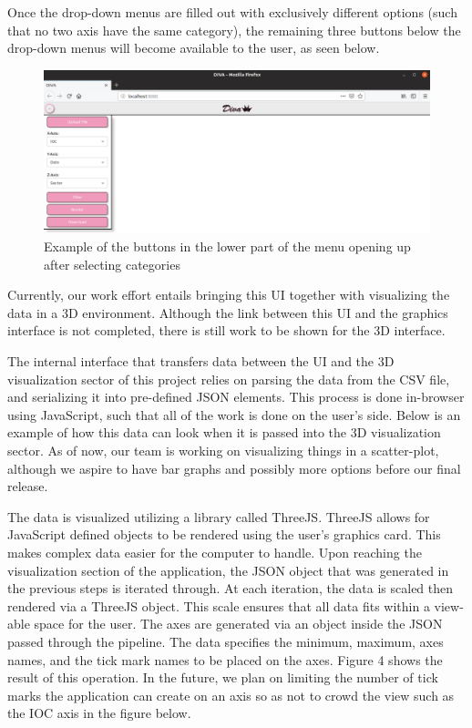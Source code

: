 \documentclass[journal,10pt,onecolumn,compsoc]{IEEEtran} \usepackage[margin=1.0in]{geometry} \usepackage{pdfpages}
\begin{document}
 Once the drop-down menus are filled out with exclusively different options (such that no two axis have the same category), the remaining three buttons below the drop-down menus will become available to the user, as seen below. 

     \begin{figure}[H]
        \centering
        \includegraphics[width=\linewidth]{menu3.png}
        \caption{Example of the buttons in the lower part of the menu opening up after selecting categories}
    \end{figure}

Currently, our work effort entails bringing this UI together with visualizing the data in a 3D environment. Although the link between this UI and the graphics interface is not completed, there is still work to be shown for the 3D interface. \newline
\newpage

The internal interface that transfers data between the UI and the 3D visualization sector of this project relies on parsing the data from the CSV file, and serializing it into pre-defined JSON elements. This process is done in-browser using JavaScript, such that all of the work is done on the user's side. Below is an example of how this data can look when it is passed into the 3D visualization sector. As of now, our team is working on visualizing things in a scatter-plot, although we aspire to have bar graphs and possibly more options before our final release. \newline

The data is visualized utilizing a library called ThreeJS. ThreeJS allows for JavaScript defined objects to be rendered using the user's graphics card. This makes complex data easier for the computer to handle. Upon reaching the visualization section of the application, the JSON object that was generated in the previous steps is iterated through. At each iteration, the data is scaled then rendered via a ThreeJS object. This scale ensures that all data fits within a view-able space for the user. The axes are generated via an object inside the JSON passed through the pipeline. The data specifies the minimum, maximum, axes names, and the tick mark names to be placed on the axes. Figure 4 shows the result of this operation. In the future, we plan on limiting the number of tick marks the application can create on an axis so as not to crowd the view such as the IOC axis in the figure below.
 
\end{document}
